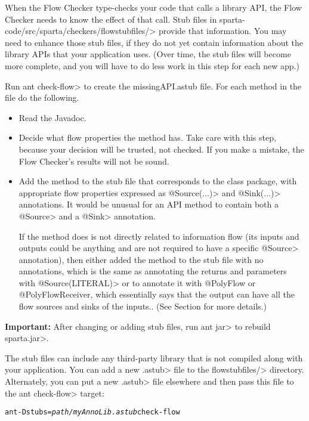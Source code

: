 When the Flow Checker type-checks your code that calls a library API, the
Flow Checker needs to know the effect of that call.  
Stub files in \<sparta-code/src/sparta/checkers/flowstubfiles/> provide
that information.  You may need to enhance those stub files, if they do not
yet contain information about the library APIs that your application uses.
(Over time, the stub files will become more complete, and you will have to
do less work in this step for each new app.)


Run \<ant check-flow> to create the missingAPI.astub file. For each method in the 
file do the following.  
\begin{itemize}
\item
Read the Javadoc.
\item
Decide what flow properties the method has.  Take care with this step,
because your decision will be trusted, not checked.  If you make a mistake,
the Flow Checker's results will not be sound.
\item
Add the method to the stub file that corresponds to the class package, with
appropriate flow properties expressed as \<@Source(...)> and
\<@Sink(...)> annotations.
It would be unusual for an API method to contain both a \<@Source>
and a \<@Sink> annotation.

If the method does is not directly related to information flow (its inputs
and outputs could be anything and are not required to have a specific
\<@Source> annotation), then either added the method to the stub file with no 
annotations, which is the same as annotating the returns and parameters with 
\<@Source(LITERAL)> or to annotate it with @PolyFlow or @PolyFlowReceiver, 
which essentially says that the
output can have all the flow sources and sinks of the inputs..
(See Section  for more details.)

\end{itemize}

\noindent
\textbf{Important:}
After changing or adding stub files, run \<ant jar> to rebuild \<sparta.jar>.



The stub files can include any third-party library that is not compiled
along with your application.  You can add a new \<.astub> file to the
\<flowstubfiles/> directory.
Alternately, you can put a new \<.astub> file elsewhere and then pass this
file to the \<ant check-flow> target:

\begin{alltt}
ant -Dstubs=\emph{path/myAnnoLib.astub} check-flow
\end{alltt}

